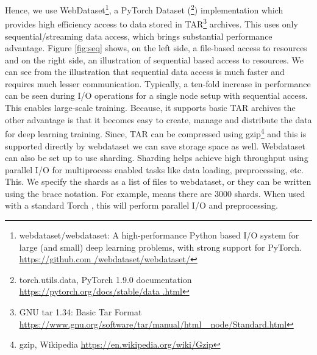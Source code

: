 Hence, we use WebDataset\footnote{webdataset/webdataset: A high-performance Python based I/O system for large (and small) deep learning problems, with strong support for PyTorch. \href{https://github.com/webdataset/webdataset/}{https://github.com /webdataset/webdataset/}}\cite{Aizman2019HighLearning}, a PyTorch Dataset (\footnote{torch.utils.data, PyTorch 1.9.0 documentation \href{https://pytorch.org/docs/stable/data.html}{https://pytorch.org/docs/stable/data .html}}) implementation which provides high efficiency access to data stored in TAR\footnote{GNU tar 1.34: Basic Tar Format \href{https://www.gnu.org/software/tar/manual/html_node/Standard.html}{https://www.gnu.org/software/tar/manual/html\_ node/Standard.html}} archives. This uses only sequential/streaming data access, which brings substantial performance advantage. Figure \ref{fig:seq} shows, on the left side, a file-based access to resources and on the right side, an illustration of sequential based access to resources. We can see from the illustration that sequential data access is much faster and requires much lesser communication. Typically, a ten-fold increase in performance can be seen during I/O operations\cite{Aizman2019HighLearning} for a single node setup with sequential access. This enables large-scale training. Because, it supports basic TAR archives the other advantage is that it becomes easy to create, manage and distribute the data for deep learning training. Since, TAR can be compressed using gzip\footnote{gzip, Wikipedia \href{https://en.wikipedia.org/wiki/Gzip}{https://en.wikipedia.org/wiki/Gzip}} and this is supported directly by webdataset we can  save storage space as well. Webdataset can also be set up to use sharding. Sharding helps achieve high throughput using parallel I/O for multiprocess enabled tasks like data loading, preprocessing, etc. This. We specify the shards as a list of files to webdataset, or they can be written using the brace notation. For example,  means there are 3000 shards. When used with a standard Torch , this will perform parallel I/O and preprocessing. 


